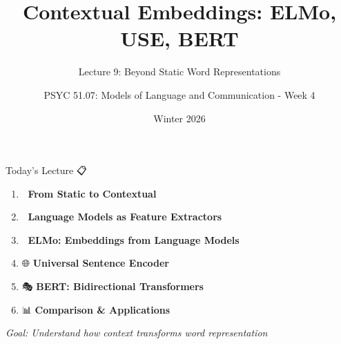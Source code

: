 \documentclass[aspectratio=169]{beamer}
\title{Contextual Embeddings: ELMo, USE, BERT}
\subtitle{Lecture 9: Beyond Static Word Representations}
\author{PSYC 51.07: Models of Language and Communication - Week 4}
\date{Winter 2026}
\begin{document}
\begin{frame}[shrink=10]
\titlepage
\end{frame}

\begin{frame}[shrink=10]{Today's Lecture 📋}
\large
\begin{enumerate}\setlength{\itemsep}{0pt}
    \item 🔄 \textbf{From Static to Contextual}
    \item 🧬 \textbf{Language Models as Feature Extractors}
    \item 🔮 \textbf{ELMo: Embeddings from Language Models}
    \item 🌐 \textbf{Universal Sentence Encoder}
    \item 🎭 \textbf{BERT: Bidirectional Transformers}
    \item 📊 \textbf{Comparison \& Applications}
\end{enumerate}

\vspace{1em}
\textit{Goal: Understand how context transforms word representation}
\end{frame}
\end{document}
